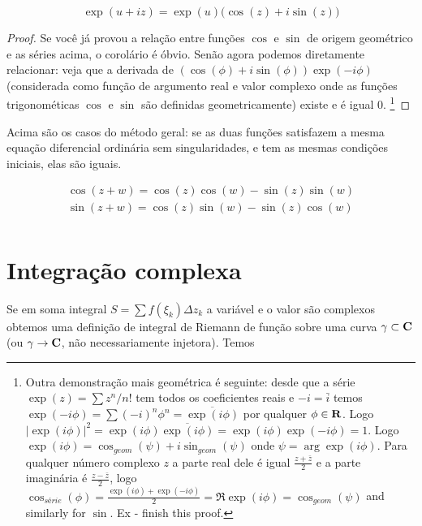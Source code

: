 \begin{cor}
\begin{equation}
\exp(u+iz) = \exp(u) \big( \cos(z) + i \sin(z) \big)
\end{equation}
\end{cor}
\begin{proof}
Se você já provou a relação entre funções $\cos$ e $\sin$ de origem geométrico e as séries acima,
o corolário é óbvio. Senão agora podemos diretamente relacionar: veja que a derivada de
$(\cos(\phi) + i \sin(\phi)) \exp(-i\phi)$ (considerada como função de argumento real e valor complexo
onde as funções trigonométicas $\cos$ e $\sin$ são definidas geometricamente)
existe e é igual $0$.
\footnote{
Outra demonstração mais geométrica é seguinte:
desde que a série $\exp(z) = \sum z^n / n!$ tem todos os coeficientes reais e $-i = \bar{i}$ temos
$\exp(-i\phi) = \sum (-i)^n \phi^n = \overline{\exp(i\phi)}$ por qualquer $\phi \in \mathbf{R}$.
Logo $|\exp(i\phi)|^2 = \exp(i\phi) \overline{\exp(i\phi)} = \exp(i\phi) \exp(-i\phi) = 1$.
Logo $\exp(i\phi) = \cos_{geom}(\psi) + i \sin_{geom}(\psi)$ onde $\psi = \arg \exp(i\phi)$.
Para qualquer número complexo $z$ a parte real dele é igual $\frac{z+\bar{z}}2$
e a parte imaginária é $\frac{z-\bar{z}}2$, logo $\cos_{série}(\phi) = \frac{\exp(i\phi)+\exp(-i\phi)}2 = \Re \exp(i\phi) = \cos_{geom}(\psi)$ and similarly for $\sin$.
Ex - finish this proof.
}
\end{proof}

\begin{remark}
Acima são os casos do método geral:
se as duas funções satisfazem a mesma equação diferencial ordinária sem singularidades,
e tem as mesmas condições iniciais, elas são iguais.
\end{remark}

\begin{cor}
\begin{multline}
\cos(z+w) = \cos(z)\cos(w) - \sin(z)\sin(w) \\
\sin(z+w) = \cos(z)\sin(w) - \sin(z)\cos(w) \\
\end{multline}
\end{cor}

\section{Integração complexa}

Se em soma integral $S = \sum f(\xi_k) \Delta z_k$ a variável e o valor são complexos
obtemos uma definição de integral de Riemann de função sobre uma curva $\gamma \subset \mathbf{C}$
(ou $\gamma \to \mathbf{C}$, não necessariamente injetora). Temos

